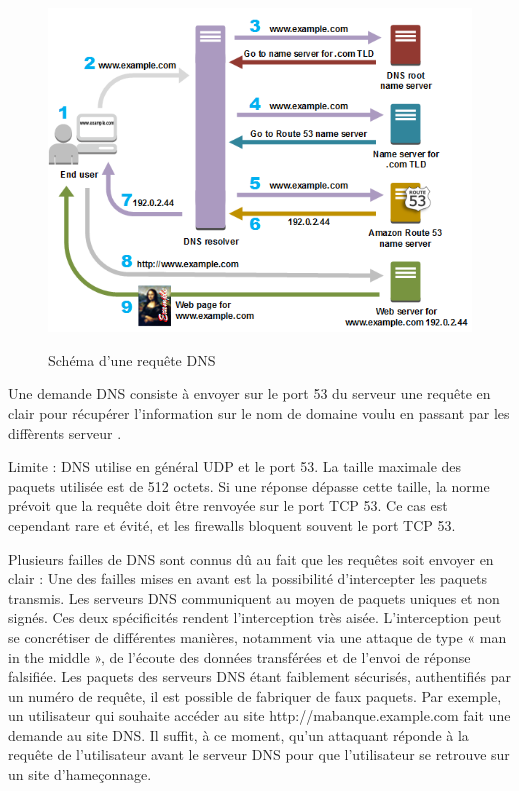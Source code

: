 \documentclass[a4paper,12pt]{article}
\begin{document}
	\begin{figure}[H]
		\begin{center}
			{\includegraphics[scale=0.5]{Images/routes-traffic.png}}
			\hspace*{12pt}\hbox{\scriptsize {}}
		\end{center}
		\caption{Schéma d'une requête DNS}		 
		
	\end{figure}

	
	Une demande DNS consiste à envoyer sur le port 53 du serveur une requête en clair pour récupérer l'information sur le nom de domaine voulu en passant par les diffèrents serveur .
	
	Limite :
	DNS utilise en général UDP et le port 53. La taille maximale des paquets utilisée est de 512 octets. Si une réponse dépasse cette taille, la norme prévoit que la requête doit être renvoyée sur le port TCP 53. Ce cas est cependant rare et évité, et les firewalls bloquent souvent le port TCP 53.
	
	Plusieurs failles de DNS sont connus dû au fait que les requêtes soit envoyer en clair : 
	Une des failles mises en avant est la possibilité d'intercepter les paquets transmis. 
	Les serveurs DNS communiquent au moyen de paquets uniques et non signés. 
	Ces deux spécificités rendent l'interception très aisée. 
	L'interception peut se concrétiser de différentes manières, notamment via une attaque de type « man in the middle », de l'écoute des données transférées et de l'envoi de réponse falsifiée.
	Les paquets des serveurs DNS étant faiblement sécurisés, authentifiés par un numéro de requête, il est possible de fabriquer de faux paquets.
	Par exemple, un utilisateur qui souhaite accéder au site http://mabanque.example.com fait une demande au site DNS.
	Il suffit, à ce moment, qu'un attaquant réponde à la requête de l'utilisateur avant le serveur DNS pour que l'utilisateur se retrouve sur un site d'hameçonnage.
	
\end{document}
